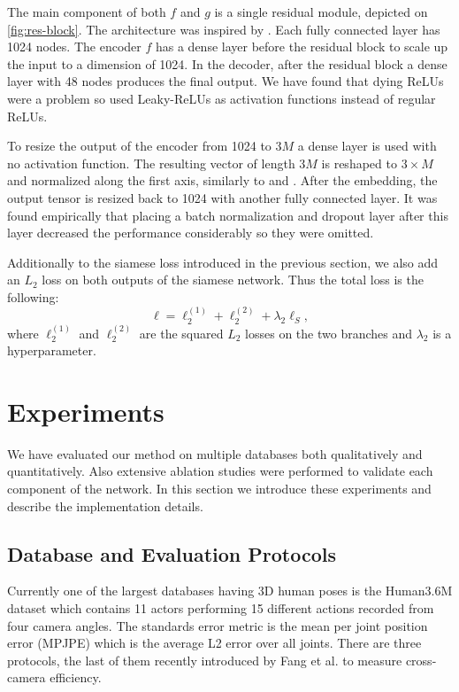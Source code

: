 \documentclass[preprint]{elsarticle}
\begin{document}
The main component of both $f$ and $g$ is a single residual module, depicted on \autoref{fig:res-block}. The architecture was inspired by \cite{3dbaseline}. Each fully connected layer has 1024 nodes. The encoder $f$ has a dense layer before the residual block to scale up the input to a dimension of 1024. In the decoder, after the residual block a dense layer with 48 nodes produces the final output. We have found that dying ReLUs were a problem so used Leaky-ReLUs as activation functions instead of regular ReLUs. 

To resize the output of the encoder from 1024 to $3M$ a dense layer is used with no activation function. The resulting vector of length $3M$ is reshaped to $3\times M$ and normalized along the first axis, similarly to \cite{facenet} and \cite{amazon_siamese-sampling}. After the embedding, the output tensor is resized back to 1024 with another fully connected layer. It was found empirically that placing a batch normalization and dropout layer after this layer decreased the performance considerably so they were omitted.

Additionally to the siamese loss introduced in the previous section, we also add an $L_2$ loss on both outputs of the siamese network. Thus the total loss is the following:
$$\ell=\ell_2^{(1)}+\ell_2^{(2)}+\lambda_2\ell_S,$$
where $\ell_2^{(1)}$ and $\ell_2^{(2)}$ are the squared $L_2$ losses on the two branches and $\lambda_2$ is a hyperparameter.

\section{Experiments}
We have evaluated our method on multiple databases both qualitatively and quantitatively. Also extensive ablation studies were performed to validate each component of the network.  In this section we introduce these experiments and describe the implementation details.

\subsection{Database and Evaluation Protocols}
Currently one of the largest databases having 3D human poses is the Human3.6M dataset which contains 11 actors performing 15 different actions re\-cor\-ded from four camera angles. The standards error metric is the mean per joint position error (MPJPE) which is the average L2 error over all joints. There are three protocols, the last of them recently introduced by Fang et al. \cite{fang2018posegrammar} to measure cross-camera efficiency.
\end{document}
